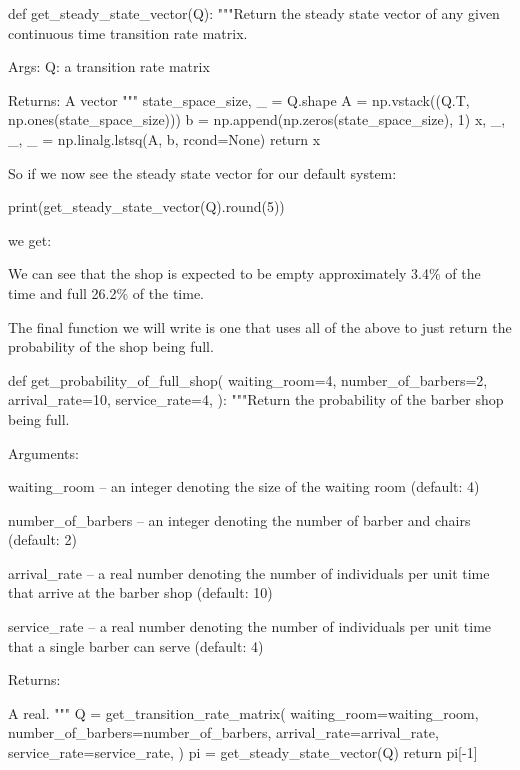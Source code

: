 \begin{pyin}
def get_steady_state_vector(Q):
    """Return the steady state vector of any given continuous
    time transition rate matrix.

    Args:
       Q: a transition rate matrix

    Returns:
        A vector
    """
    state_space_size, _ = Q.shape
    A = np.vstack((Q.T, np.ones(state_space_size)))
    b = np.append(np.zeros(state_space_size), 1)
    x, _, _, _ = np.linalg.lstsq(A, b, rcond=None)
    return x
\end{pyin}

So if we now see the steady state vector for our default system:

\begin{pyin}
print(get_steady_state_vector(Q).round(5))
\end{pyin}

we get:

\begin{pyout}
[0.03431 0.08577 0.10722 0.13402 0.16752 0.2094  0.26176]
\end{pyout}

We can see that the shop is expected to be empty approximately 3.4\% of the time
and full 26.2\% of the time.

The final function we will write is one that uses all of
the above to just return the probability of the shop being full.

\begin{pyin}
def get_probability_of_full_shop(
    waiting_room=4,
    number_of_barbers=2,
    arrival_rate=10,
    service_rate=4,
):
    """Return the probability of the barber shop being full.

    Arguments:

    waiting_room --  an integer denoting the size of
                     the waiting room (default: 4)

    number_of_barbers --  an integer denoting the number
                          of barber and chairs
                          (default: 2)

    arrival_rate -- a real number denoting the number of
                    individuals per unit time that arrive
                    at the barber shop (default: 10)

    service_rate -- a real number denoting the number of
                    individuals per unit time that a single
                    barber can serve (default: 4)

    Returns:

    A real.
    """
    Q = get_transition_rate_matrix(
        waiting_room=waiting_room,
        number_of_barbers=number_of_barbers,
        arrival_rate=arrival_rate,
        service_rate=service_rate,
    )
    pi = get_steady_state_vector(Q)
    return pi[-1]
\end{pyin}

